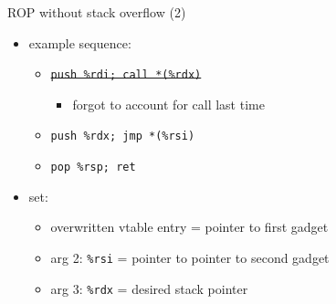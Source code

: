 \begin{frame}{ROP without stack overflow (2)}
    \begin{itemize}
    \item example sequence:
        \begin{itemize}
            \item \sout{\texttt{push \%rdi; call *(\%rdx)}}
                \begin{itemize}
                    \item forgot to account for call last time
                \end{itemize}
            \item \texttt{push \%rdx; jmp *(\%rsi)}
            \item \texttt{pop \%rsp; ret}
        \end{itemize}
    \item set:
        \begin{itemize}
        \item overwritten vtable entry = pointer to first gadget
        \item arg 2: {\tt \%rsi} = pointer to pointer to second gadget
        \item arg 3: {\tt \%rdx} = desired stack pointer
        \end{itemize}
    \end{itemize}
\end{frame}

